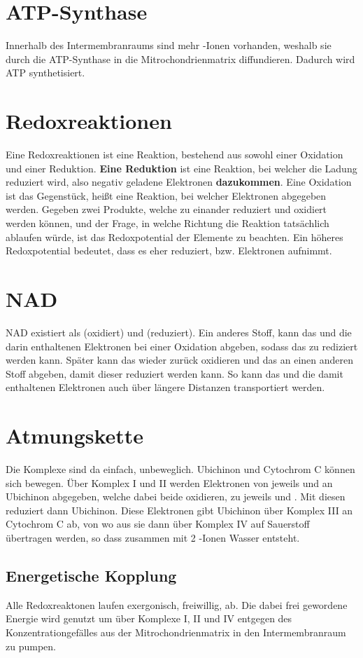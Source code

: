 \documentclass{article}
\begin{document}
\section{ATP-Synthase}
Innerhalb des Intermembranraums sind mehr -Ionen vorhanden, weshalb sie durch die ATP-Synthase in die Mitrochondrienmatrix diffundieren. Dadurch wird ATP synthetisiert.  
 
\section{Redoxreaktionen}
Eine Redoxreaktionen ist eine Reaktion, bestehend aus sowohl einer Oxidation und einer Reduktion. \textbf{Eine Reduktion} ist eine Reaktion, bei welcher die Ladung reduziert wird, also negativ geladene Elektronen \textbf{dazukommen}. Eine Oxidation ist das Gegenstück, heißt eine Reaktion, bei welcher Elektronen abgegeben werden. \newline
Gegeben zwei Produkte, welche zu einander reduziert und oxidiert werden können, und der Frage, in welche Richtung die Reaktion tatsächlich ablaufen würde, ist das Redoxpotential der Elemente zu beachten. Ein höheres Redoxpotential bedeutet, dass es eher reduziert, bzw. Elektronen aufnimmt. 
 
\section{NAD}
NAD existiert als  (oxidiert) und  (reduziert).
Ein anderes Stoff,  kann das  und die darin enthaltenen Elektronen bei einer Oxidation abgeben, sodass das  zu  rediziert werden kann. Später kann das  wieder zurück oxidieren und das  an einen anderen Stoff abgeben, damit dieser reduziert werden kann. So kann das  und die damit enthaltenen Elektronen auch über längere Distanzen transportiert werden.
 
\section{Atmungskette} 
Die Komplexe sind da einfach, unbeweglich. Ubichinon und Cytochrom C können sich bewegen. 
Über Komplex I und II werden Elektronen von jeweils  und  an Ubichinon abgegeben, welche dabei beide oxidieren, zu jeweils  und . Mit diesen reduziert dann Ubichinon. Diese Elektronen gibt Ubichinon über Komplex III an Cytochrom C ab, von wo aus sie dann über Komplex IV auf Sauerstoff übertragen werden, so dass zusammen mit 2 -Ionen Wasser entsteht.
\subsection{Energetische Kopplung}
Alle Redoxreaktonen laufen exergonisch, freiwillig, ab. Die dabei frei gewordene Energie wird genutzt um  über Komplexe I, II und IV entgegen des Konzentrationgefälles aus der Mitrochondrienmatrix in den Intermembranraum zu pumpen. 
 
\end{document}
